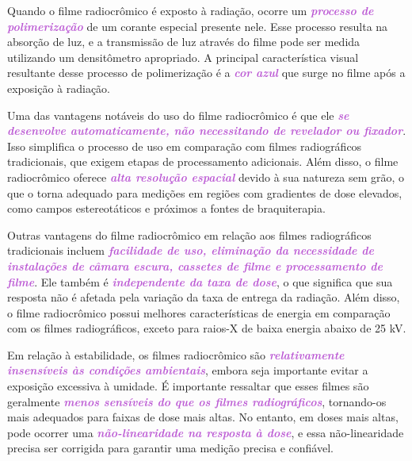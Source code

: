 \documentclass[11pt,a4paper]{article}
\begin{document}
	Quando o filme radiocrômico é exposto à radiação, ocorre um \textcolor{MediumOrchid}{\textit{\textbf{processo de polimerização}}} de um corante especial presente nele. Esse processo resulta na absorção de luz, e a transmissão de luz através do filme pode ser medida utilizando um densitômetro apropriado. A principal característica visual resultante desse processo de polimerização é a \textcolor{MediumOrchid}{\textit{\textbf{cor azul}}} que surge no filme após a exposição à radiação.

	Uma das vantagens notáveis do uso do filme radiocrômico é que ele \textcolor{MediumOrchid}{\textit{\textbf{se desenvolve automaticamente, não necessitando de revelador ou fixador}}}. Isso simplifica o processo de uso em comparação com filmes radiográficos tradicionais, que exigem etapas de processamento adicionais. Além disso, o filme radiocrômico oferece \textcolor{MediumOrchid}{\textit{\textbf{alta resolução espacial}}} devido à sua natureza sem grão, o que o torna adequado para medições em regiões com gradientes de dose elevados, como campos estereotáticos e próximos a fontes de braquiterapia.

	Outras vantagens do filme radiocrômico em relação aos filmes radiográficos tradicionais incluem \textcolor{MediumOrchid}{\textit{\textbf{facilidade de uso, eliminação da necessidade de instalações de câmara escura, cassetes de filme e processamento de filme}}}. Ele também é \textcolor{MediumOrchid}{\textit{\textbf{independente da taxa de dose}}}, o que significa que sua resposta não é afetada pela variação da taxa de entrega da radiação. Além disso, o filme radiocrômico possui melhores características de energia em comparação com os filmes radiográficos, exceto para raios-X de baixa energia abaixo de 25 kV.

	Em relação à estabilidade, os filmes radiocrômico são \textcolor{MediumOrchid}{\textit{\textbf{relativamente insensíveis às condições ambientais}}}, embora seja importante evitar a exposição excessiva à umidade. É importante ressaltar que esses filmes são geralmente \textcolor{MediumOrchid}{\textit{\textbf{menos sensíveis do que os filmes radiográficos}}}, tornando-os mais adequados para faixas de dose mais altas. No entanto, em doses mais altas, pode ocorrer uma \textcolor{MediumOrchid}{\textit{\textbf{não-linearidade na resposta à dose}}}, e essa não-linearidade precisa ser corrigida para garantir uma medição precisa e confiável.

\end{document}
